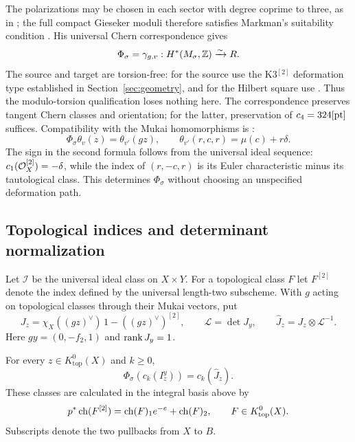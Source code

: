 The polarizations may be chosen in each sector with degree coprime
to three, as in \cite[\S4.5]{wuebben17}; the full compact
Gieseker moduli therefore satisfies Markman's suitability condition
\cite[Definition~3.4]{markman08}. His universal Chern
correspondence \cite[Theorem~1.2 and equation~(3)]{markman08}
gives
\begin{equation}\label{eq:Phi}
 \Phi_\sigma=\gamma_{g,v}:H^*(M_\sigma,\mathbb Z)\xrightarrow{\sim} R.
\end{equation}
The source and target are torsion-free: for the source use the
K3$^{[2]}$ deformation type established in Section~\ref{sec:geometry},
and for the Hilbert square use \cite[Theorem~3.1]{totaro}.
Thus the modulo-torsion qualification loses nothing here.
The correspondence preserves tangent Chern classes and
orientation; for the latter, preservation of $c_4=324[\mathrm{pt}]$
suffices. Compatibility with the Mukai homomorphisms is
\cite[Theorem~3.9 and diagram~(41)]{markman08}:
\begin{equation}\label{eq:theta-transport}
 \Phi_\sigma\theta_v(z)=\theta_{v'}(gz),\qquad
 \theta_{v'}(r,c,r)=\mu(c)+r\delta.
\end{equation}
The sign in the second formula follows from the universal ideal
sequence: $c_1(\mathcal O_X^{[2]})=-\delta$, while the index of
$(r,-c,r)$ is its Euler characteristic minus its tautological
class. This determines $\Phi_\sigma$ without choosing an
unspecified deformation path.

\subsection{Topological indices and determinant normalization}
Let $\mathcal I$ be the universal ideal class on $X\times Y$.
For a topological class $F$ let $F^{[2]}$ denote the index
defined by the universal length-two subscheme. With $g$ acting
on topological classes through their Mukai vectors, put
\begin{equation}\label{eq:J}
 J_z=\chi_X((gz)^\vee)\,1-((gz)^\vee)^{[2]},\qquad
 \mathcal L=\det J_y,\qquad \widehat J_z=J_z\otimes\mathcal L^{-1}.
\end{equation}
Here $gy=(0,-f_2,1)$ and $\operatorname{rank} J_y=1$.

\begin{proposition}\label{prop:indices}
For every $z\in K^0_{\mathrm{top}}(X)$ and $k\ge0$,
\begin{equation}\label{eq:indices-transport}
 \Phi_\sigma(c_k(I_z^y))=c_k(\widehat J_z).
\end{equation}
These classes are calculated in the integral basis above by
\begin{equation}\label{eq:tautological-character}
 p^*\operatorname{ch}(F^{[2]})=\operatorname{ch}(F)_1e^{-e}+\operatorname{ch}(F)_2,
 \qquad F\in K^0_{\mathrm{top}}(X).
\end{equation}
Subscripts denote the two pullbacks from $X$ to $B$.
\end{proposition}

